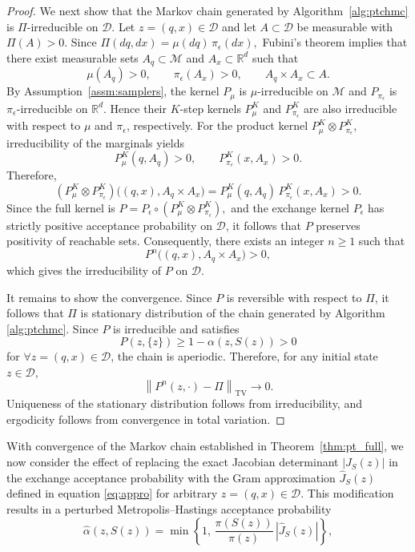 \documentclass[12pt]{article}
\begin{document}
\begin{proof}
We next show that the Markov chain generated by Algorithm~\ref{alg:ptchmc}
is $\Pi$-irreducible on $\mathcal D$.
Let $z=(q,x)\in\mathcal D$ and let $A\subset\mathcal D$ be measurable with
\(
\Pi(A) > 0.
\)
Since
\(
\Pi(dq,dx)=\mu(dq)\,\pi_\epsilon(dx),
\)
Fubini's theorem implies that there exist measurable sets
$A_q\subset\mathcal M$ and $A_x\subset\mathbb R^d$
such that
\[
\mu(A_q)>0,
\qquad
\pi_\epsilon(A_x)>0,
\qquad
A_q\times A_x \subset A.
\]
By Assumption~\ref{assm:samplers}, the kernel $P_\mu$ is
$\mu$-irreducible on $\mathcal M$ and
$P_{\pi_\epsilon}$ is $\pi_\epsilon$-irreducible on $\mathbb R^d$.
Hence their $K$-step kernels $P_\mu^K$ and
$P_{\pi_\epsilon}^K$ are also irreducible with respect to
$\mu$ and $\pi_\epsilon$, respectively.
For the product kernel
\(
P_\mu^K \otimes P_{\pi_\epsilon}^K\),
irreducibility of the marginals yields
\[
P_\mu^K(q,A_q) > 0,
\qquad
P_{\pi_\epsilon}^K(x,A_x) > 0.
\]
Therefore,
\[
\left(
P_\mu^K \otimes P_{\pi_\epsilon}^K
\right)
\big((q,x),A_q\times A_x\big)
=
P_\mu^K(q,A_q)\,
P_{\pi_\epsilon}^K(x,A_x)
>0.
\]
Since the full kernel is
\(
P
=
P_\epsilon
\circ
\left(
P_\mu^K \otimes P_{\pi_\epsilon}^K
\right),
\)
and the exchange kernel $P_\epsilon$ has strictly positive
acceptance probability on $\mathcal D$,
it follows that $P$ preserves positivity of reachable sets.
Consequently, there exists an integer $n\ge1$ such that
\[
P^n\big((q,x),A_q\times A_x\big) > 0,
\]
which gives the irreducibility of $P$ on $\mathcal{D}$.

It remains to show the convergence. Since $P$ is reversible with respect to $\Pi$, it follows that $\Pi$ is stationary distribution of the chain generated by Algorithm \ref{alg:ptchmc}.
Since $P$ is irreducible and satisfies
\[
P(z,\{z\}) \ge 1-\alpha(z,S(z)) > 0
\]
for $\forall z = (q,x)\in\mathcal{D}$,
the chain is aperiodic.
Therefore, for any initial state $z \in \mathcal D$,
\[
\left\|
P^n(z,\cdot) - \Pi
\right\|_{\mathrm{TV}}
\longrightarrow 0.
\]
Uniqueness of the stationary distribution follows from irreducibility, and ergodicity follows from convergence in total variation.
\end{proof}
With convergence of the Markov chain established in Theorem~\ref{thm:pt_full}, we now consider the effect of replacing the exact Jacobian determinant $|J_S(z)|$ in the exchange acceptance probability with the Gram approximation $\widehat{J}_S(z)$ defined in equation \eqref{eq:appro} for arbitrary $z=(q,x)\in\mathcal{D}$. This modification results in a perturbed Metropolis--Hastings acceptance probability
\[
\widehat{\alpha}(z,S(z))
=
\min\!\left\{
1,\,
\frac{\pi(S(z))}{\pi(z)}
\,|\widehat{J}_S(z)|
\right\},
\]
\end{document}
